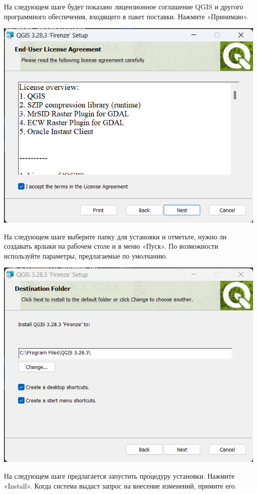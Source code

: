 \documentclass[
  12pt,
]{book}
\begin{document}
На следующем шаге будет показано лицензионное соглашение QGIS и другого программного обеспечения, входящего в пакет поставки. Нажмите «Принимаю».

\includegraphics{images/installation_instruction_win/win02.png}

На следующем шаге выберите папку для установки и отметьте, нужно ли создавать ярлыки на рабочем столе и в меню «Пуск». По возможности используйте параметры, предлагаемые по умолчанию.

\includegraphics{images/installation_instruction_win/win03.png}

На следующем шаге предлагается запустить процедуру установки. Нажмите «Install». Когда система выдаст запрос на внесение изменений, примите его.
\end{document}
